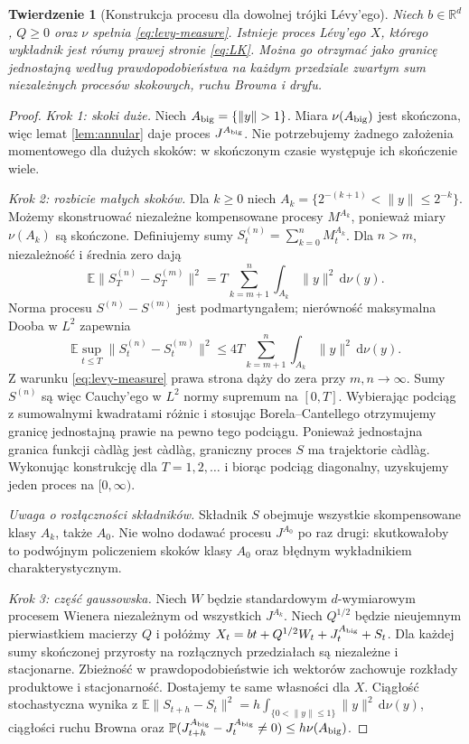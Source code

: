 \documentclass[11pt,a4paper,oneside]{report}
\numberwithin{equation}{chapter}
\theoremstyle{plain}
\newtheorem{twierdzenie}{Twierdzenie}[chapter]
\theoremstyle{definition}
\theoremstyle{remark}
\newcommand{\R}{\mathbb{R}}
\newcommand{\Prob}{\mathbb{P}}
\newcommand{\E}{\mathbb{E}}
\newcommand{\dd}{\mathrm{d}}
\begin{document}
\begin{twierdzenie}[Konstrukcja procesu dla dowolnej trójki Lévy'ego]
\label{th:triplet-construction}
Niech $b\in\R^d$, $Q\ge0$ oraz $\nu$ spełnia
\eqref{eq:levy-measure}. Istnieje proces Lévy'ego
$X$, którego wykładnik jest równy prawej stronie
\eqref{eq:LK}. Można go otrzymać jako granicę
jednostajną według prawdopodobieństwa na każdym
przedziale zwartym sum niezależnych procesów skokowych,
ruchu Browna i dryfu.
\end{twierdzenie}
\begin{proof}
\emph{Krok 1: skoki duże.} Niech $A_{\rm big}=\{\|y\|>1\}$.
Miara $\nu(A_{\rm big})$ jest skończona, więc lemat
\ref{lem:annular} daje proces $J^{A_{\rm big}}$. Nie potrzebujemy
żadnego założenia momentowego dla dużych skoków:
w skończonym czasie występuje ich skończenie wiele.

\emph{Krok 2: rozbicie małych skoków.} Dla $k\ge0$ niech
$A_k=\{2^{-(k+1)}<\|y\|\le2^{-k}\}$.
Możemy skonstruować niezależne kompensowane procesy
$M^{A_k}$, ponieważ miary $\nu(A_k)$ są skończone.
Definiujemy sumy $S_t^{(n)}=\sum_{k=0}^n M_t^{A_k}$.
Dla $n>m$, niezależność i średnia zero dają
\[
\E\|S_T^{(n)}-S_T^{(m)}\|^2
=T\sum_{k=m+1}^n\int_{A_k}\|y\|^2\,\dd\nu(y).
\]
Norma procesu $S^{(n)}-S^{(m)}$ jest podmartyngałem;
nierówność maksymalna Dooba w $L^2$ zapewnia
\[
\E\sup_{t\le T}\|S_t^{(n)}-S_t^{(m)}\|^2
\le4T\sum_{k=m+1}^n\int_{A_k}\|y\|^2\,\dd\nu(y).
\tag{10.4}\label{eq:levy-l2-sup}
\]
Z warunku \eqref{eq:levy-measure} prawa strona dąży
do zera przy $m,n\to\infty$. Sumy $S^{(n)}$
są więc Cauchy'ego w $L^2$ normy supremum na
$[0,T]$. Wybierając podciąg z sumowalnymi kwadratami
różnic i stosując Borela--Cantellego otrzymujemy
granicę jednostajną prawie na pewno tego podciągu.
Ponieważ jednostajna granica funkcji càdlàg jest càdlàg,
graniczny proces $S$ ma trajektorie càdlàg.
Wykonując konstrukcję dla $T=1,2,\ldots$ i biorąc podciąg
diagonalny, uzyskujemy jeden proces na $[0,\infty)$.

\emph{Uwaga o rozłączności składników.} Składnik $S$ obejmuje
wszystkie skompensowane klasy $A_k$, także $A_0$.
Nie wolno dodawać procesu $J^{A_0}$ po raz drugi: skutkowałoby
to podwójnym policzeniem skoków klasy $A_0$ oraz błędnym
wykładnikiem charakterystycznym.

\emph{Krok 3: część gaussowska.} Niech $W$ będzie
standardowym $d$-wymiarowym procesem Wienera
niezależnym od wszystkich $J^{A_k}$. Niech $Q^{1/2}$
będzie nieujemnym pierwiastkiem macierzy $Q$ i połóżmy
$X_t=bt+Q^{1/2}W_t+J_t^{A_{\rm big}}+S_t$.
Dla każdej sumy skończonej przyrosty na rozłącznych
przedziałach są niezależne i stacjonarne. Zbieżność w
prawdopodobieństwie ich wektorów zachowuje rozkłady
produktowe i stacjonarność. Dostajemy te same własności
dla $X$. Ciągłość stochastyczna wynika z
$\E\|S_{t+h}-S_t\|^2
=h\int_{\{0<\|y\|\le1\}}\|y\|^2\,\dd\nu(y)$,
ciągłości ruchu Browna oraz
$\Prob(J_{t+h}^{A_{\rm big}}-J_t^{A_{\rm big}}\ne0)\le h\nu(A_{\rm big})$.


\end{proof}
\end{document}
